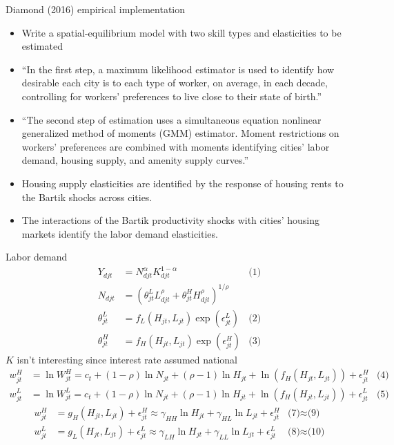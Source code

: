 \documentclass[11pt,notes=hide,aspectratio=169]{beamer}
\begin{document}
\begin{frame}{Diamond (2016) empirical implementation}
\begin{itemize}
	\item Write a spatial-equilibrium model with two skill types and elasticities to be estimated
	\item ``In the first step, a maximum likelihood estimator is used to identify how desirable each city is to each type of worker, on average, in each decade, controlling for workers' preferences to live close to their state of birth.''
	\item ``The second step of estimation uses a simultaneous equation nonlinear generalized method of moments (GMM) estimator. Moment restrictions on workers' preferences are combined with moments identifying cities' labor demand, housing supply, and amenity supply curves.''
	\item Housing supply elasticities are identified by the response of housing rents to the Bartik shocks across cities. 
	\item The interactions of the Bartik productivity shocks with cities' housing markets identify the labor demand elasticities.
\end{itemize}
\end{frame}
\begin{frame}{Labor demand}
\vspace{-8mm}
\begin{align*}
Y_{djt} &= N^{\alpha}_{djt} K^{1-\alpha}_{djt}
&\text{(1)} \\
N_{djt} &= \left(\theta^{L}_{jt} L^{\rho}_{djt} + \theta^{H}_{jt} H^{\rho}_{djt}\right)^{1/{\rho}} \\
\theta^{L}_{jt} &= f_L \left(H_{jt}, L_{jt}\right) \exp(\epsilon_{jt}^{L})
&\text{(2)} \\
\theta^{H}_{jt} &= f_H \left(H_{jt}, L_{jt}\right) \exp(\epsilon_{jt}^{H})
&\text{(3)}
\end{align*}
$K$ isn't interesting since interest rate assumed national
\begin{align*}
w_{jt}^{H} &= \ln W_{jt}^{H} = c_{t} + (1-\rho) \ln N_{jt} + (\rho-1) \ln H_{jt} + \ln \left(f_H(H_{jt},L_{jt})\right) + \epsilon_{jt}^{H}
&\text{(4)} \\
w_{jt}^{L} &= \ln W_{jt}^{L} = c_{t} + (1-\rho) \ln N_{jt} + (\rho-1) \ln H_{jt} + \ln \left(f_H(H_{jt},L_{jt})\right) + \epsilon_{jt}^{L}
&\text{(5)} %
\end{align*}
\begin{align*}
w_{jt}^{H} &= g_{H} \left(H_{jt},L_{jt}\right) + \epsilon_{jt}^{H}
\approx \gamma_{HH} \ln H_{jt} + \gamma_{HL} \ln L_{jt} + \epsilon_{jt}^{H}
&\text{(7)}\approx\text{(9)} \\
w_{jt}^{L} &= g_{L} \left(H_{jt},L_{jt}\right) + \epsilon_{jt}^{L}
\approx \gamma_{LH} \ln H_{jt} + \gamma_{LL} \ln L_{jt} + \epsilon_{jt}^{L}
&\text{(8)} \approx \text{(10)} %
\end{align*}
\end{frame}
\end{document}
